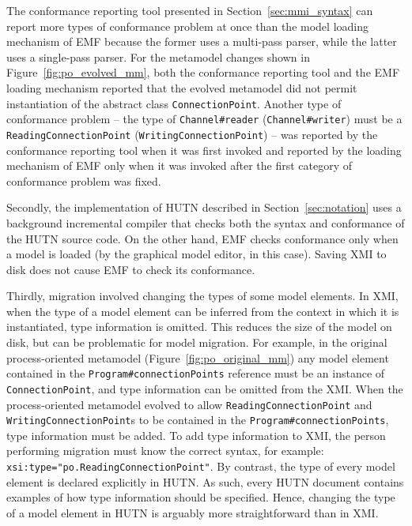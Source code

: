 The conformance reporting tool presented in Section~\ref{sec:mmi_syntax} can report more types of conformance problem at once than the model loading mechanism of EMF because the former uses a multi-pass parser, while the latter uses a single-pass parser. For the metamodel changes shown in Figure~\ref{fig:po_evolved_mm}, both the conformance reporting tool and the EMF loading mechanism reported that the evolved metamodel did not permit instantiation of the abstract class \texttt{Co\-nn\-ec\-ti\-o\-nPo\-i\-nt}. Another type of conformance problem -- the type of \texttt{Ch\-an\-n\-el\#re\-ad\-er} (\texttt{Ch\-an\-n\-el\#wr\-it\-er}) must be a \texttt{Re\-ad\-i\-ngCo\-nn\-ec\-ti\-o\-nPo\-i\-nt} (\texttt{Wr\-i\-ti\-ngCo\-nn\-ec\-ti\-o\-nPo\-i\-nt}) -- was reported by the conformance reporting tool when it was first invoked and reported by the loading mechanism of EMF only when it was invoked after the first category of conformance problem was fixed.

Secondly, the implementation of HUTN described in Section~\ref{sec:notation} uses a background incremental compiler that checks both the syntax and conformance of the HUTN source code. On the other hand, EMF checks conformance only when a model is loaded (by the graphical model editor, in this case). Saving XMI to disk does not cause EMF to check its conformance.

Thirdly, migration involved changing the types of some model elements. In XMI, when the type of a model element can be inferred from the context in which it is instantiated, type information is omitted. This reduces the size of the model on disk, but can be problematic for model migration. For example, in the original process-oriented metamodel (Figure~\ref{fig:po_original_mm}) any model element contained in the \texttt{Pr\-og\-r\-am\#co\-nn\-ec\-ti\-onPo\-in\-ts} reference must be an instance of \texttt{Co\-nn\-ec\-ti\-onPo\-in\-t}, and type information can be omitted from the XMI. When the process-oriented metamodel evolved to allow \texttt{Re\-ad\-i\-ngCo\-nn\-ec\-ti\-o\-nPo\-i\-nt} and \texttt{Wr\-i\-ti\-ngCo\-nn\-ec\-ti\-o\-nPo\-i\-nt}s to be contained in the \texttt{Pr\-og\-r\-am\#co\-nn\-ec\-ti\-onPo\-in\-ts}, type information must be added. To add type information to XMI, the person performing migration must know the correct syntax, for example: \texttt{xsi:type="po.Re\-ad\-i\-ngCo\-nn\-ec\-ti\-onPo\-i\-nt"}. By contrast, the type of every model element is declared explicitly in HUTN. As such, every HUTN document contains examples of how type information should be specified. Hence, changing the type of a model element in HUTN is arguably more straightforward than in XMI.


